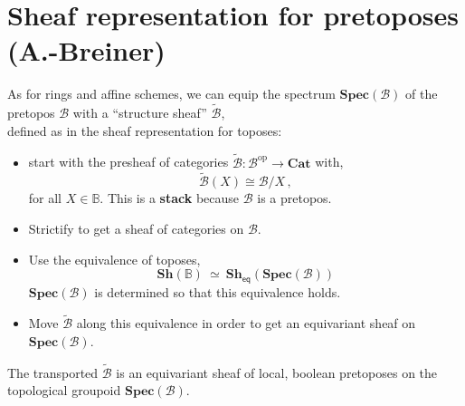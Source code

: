 \documentclass[11pt]{article}
\newcommand{\B}{\ensuremath{\mathbb{B}}}
\theoremstyle{remark}
\theoremstyle{definition}
\newcommand{\myemph}[1]{\textbf{#1}}
\begin{document}
\section{Sheaf representation for pretoposes (A.-Breiner)}

As for rings and affine schemes, we can equip the spectrum $\mathbf{Spec}(\mathcal{B})$ of the pretopos $\mathcal{B}$ with a ``structure sheaf'' $\tilde{\mathcal{B}}$,\\
  defined as in the sheaf representation for toposes: 
\begin{itemize}
\item start with the presheaf of categories $\tilde{\mathcal{B}} : \mathcal{B}^{\mathrm{op}}\to\mathbf{Cat}$ with,
\[
\tilde{\mathcal{B}}(X) \cong \mathcal{B}/X\,,
\]
for all $X\in \B$. This is a \myemph{stack} because $\mathcal{B}$ is a pretopos.
 
\item Strictify to get a sheaf of categories on $\mathcal{B}$. 

\item Use the equivalence of toposes,
\[
\mathbf{Sh}(\B)\ \simeq\ \mathbf{Sh}_{\mathsf{eq}}(\mathbf{Spec}(\mathcal{B}))
\]
$\mathbf{Spec}(\mathcal{B})$ is determined so that this equivalence holds.

\item Move $\tilde{\mathcal{B}}$ along this equivalence in order to get an equivariant sheaf on $\mathbf{Spec}(\mathcal{B})$.
\end{itemize}


The transported $\tilde{\mathcal{B}}$  is an equivariant sheaf of local, boolean pretoposes on the topological groupoid $\mathbf{Spec}(\mathcal{B})$.
\end{document}

